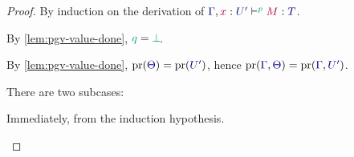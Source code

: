 \begin{proof}
  \label{prf:lem-pgv-substitution}
  By induction on the derivation of $\tseq[\cs{p}]{\ty{\Gamma},\tmty{x}{U'}}{M}{T}$.

  \begin{case*}
    By \cref{lem:pgv-value-done}, $\cs{q}=\cs{\pbot}$.
    \begin{mathpar}
    \end{mathpar}
  \end{case*}
  \begin{case*}
    By \cref{lem:pgv-value-done}, $\pr(\ty{\Theta})=\pr(\ty{U'})$, hence $\pr(\ty{\Gamma},\ty{\Theta})=\pr(\ty{\Gamma},\ty{U'})$.
    \begin{mathpar}
    \end{mathpar}
  \end{case*}
  \begin{case*}
    There are two subcases:
    \begin{subcase*}[$\tm{x}\in\tm{M}$]
      Immediately, from the induction hypothesis.
      \begin{mathpar}
\end{mathpar}
\end{subcase*}
\end{case*}
\end{proof}
